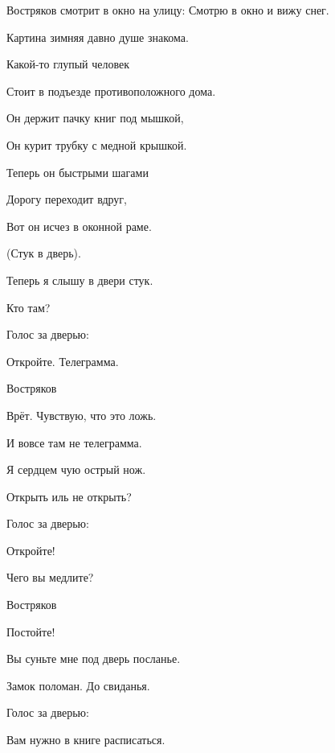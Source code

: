\leavevmode\hspace{-1cm}
\fontsize{14}{16}\selectfont Востряков \normalsize смотрит в окно на улицу:
Смотрю в окно и вижу снег.
 
Картина зимняя давно душе знакома.
 
Какой-то глупый человек
 
Стоит в подъезде противоположного дома.
 
Он держит пачку книг под мышкой,
 
Он курит трубку с медной крышкой.
 
Теперь он быстрыми шагами
 
Дорогу переходит вдруг,
 
Вот он исчез в оконной раме.

\begin{center}
(Стук в дверь).
\end{center}

Теперь я слышу в двери стук.
 
Кто там?
 
\leavevmode\hspace{-1cm}
\fontsize{14}{16}\selectfont Голос за дверью: \normalsize
 
Откройте. Телеграмма.
 
\leavevmode\hspace{-1cm}
\fontsize{14}{16}\selectfont Востряков \normalsize
 
Врёт. Чувствую, что это ложь.
 
И вовсе там не телеграмма.
 
Я сердцем чую острый нож.
 
Открыть иль не открыть?
 
\leavevmode\hspace{-1cm}
\fontsize{14}{16}\selectfont Голос за дверью: \normalsize
 
Откройте!
 
Чего вы медлите?
 
\leavevmode\hspace{-1cm}
\fontsize{14}{16}\selectfont Востряков \normalsize
 
Постойте!
 
Вы суньте мне под дверь посланье.
 
Замок поломан. До свиданья.

\leavevmode\hspace{-1cm}
\fontsize{14}{16}\selectfont Голос за дверью: \normalsize

Вам нужно в книге расписаться.
 
